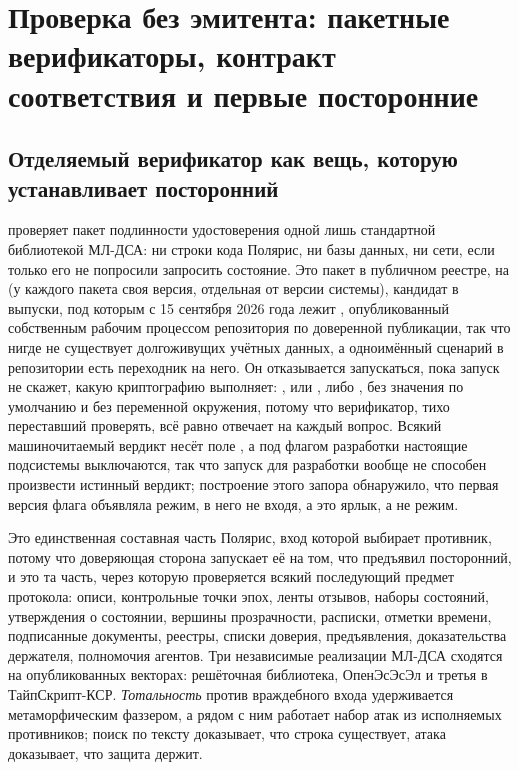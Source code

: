 \section{Проверка без эмитента: пакетные верификаторы, контракт соответствия и первые посторонние}
\label{sec:verifiers}



\subsection{Отделяемый верификатор как вещь, которую устанавливает посторонний}

 проверяет пакет подлинности удостоверения одной лишь стандартной библиотекой
МЛ-ДСА: ни строки кода Полярис, ни базы данных, ни сети, если только его не попросили запросить
состояние. Это пакет в публичном
реестре, на  (у каждого пакета своя версия, отдельная от версии системы),
кандидат в выпуски, под которым с 15 сентября 2026 года лежит
, опубликованный собственным рабочим процессом репозитория по доверенной публикации,
так что нигде не существует долгоживущих учётных данных, а одноимённый сценарий в репозитории
есть переходник на него. Он отказывается запускаться, пока запуск не скажет, какую криптографию
выполняет: ,  или , либо
, без значения по умолчанию и без переменной окружения, потому что
верификатор, тихо переставший проверять, всё равно отвечает на каждый вопрос. Всякий
машиночитаемый вердикт несёт поле , а под флагом разработки настоящие подсистемы
выключаются, так что запуск для разработки вообще не способен произвести истинный вердикт;
построение этого запора обнаружило, что первая версия флага объявляла режим, в него не входя, а это
ярлык, а не режим. \sImpl

Это единственная составная часть Полярис, вход которой выбирает противник, потому что доверяющая
сторона запускает её на том, что предъявил посторонний, и это та часть, через которую проверяется
всякий последующий предмет протокола: описи, контрольные точки эпох, ленты отзывов, наборы
состояний, утверждения о состоянии, вершины прозрачности, расписки, отметки времени, подписанные
документы, реестры, списки доверия, предъявления, доказательства держателя, полномочия агентов.
Три независимые реализации МЛ-ДСА сходятся на опубликованных векторах: решёточная библиотека,
ОпенЭсЭсЭл и третья в ТайпСкрипт-КСР. \emph{Тотальность} против враждебного входа удерживается
метаморфическим фаззером, а рядом с ним работает набор атак из исполняемых противников; поиск по тексту
доказывает, что строка существует, атака доказывает, что защита держит. \sImpl

